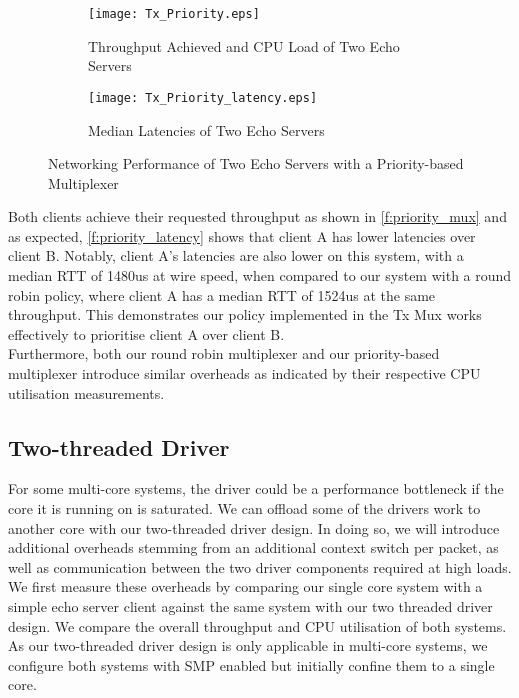 \noindent\begin{figure}[h]
    \centering
	\begin{multicols}{2}
		\begin{subfigure}[b]{0.45\textwidth}
        \centering
        \texttt{[image: Tx\_Priority.eps]}
        \caption{Throughput Achieved and CPU Load of Two Echo Servers}
        \label{f:priority_mux}
    \end{subfigure}\qquad
    \begin{subfigure}[b]{0.45\textwidth}
        \vspace{52pt}
        \centering
        \texttt{[image: Tx\_Priority\_latency.eps]}
        \vspace{0.5pt}
        \caption{Median Latencies of Two Echo Servers}
        \label{f:priority_latency}
    \end{subfigure}
\end{multicols}
\caption{Networking Performance of Two Echo Servers with a Priority-based Multiplexer}
\end{figure}

Both clients achieve their requested throughput as shown in \autoref{f:priority_mux} and as expected, \autoref{f:priority_latency} shows
that client A has lower latencies over client B. Notably, client A's latencies are also lower on this system, with a median RTT
of 1480us at wire speed, when compared to our system with a round robin policy, where client A has a median RTT of 1524us at the same
throughput. This demonstrates our policy implemented in the Tx Mux works effectively to prioritise
client A over client B.\\
Furthermore, both our round robin multiplexer and our priority-based multiplexer introduce similar overheads as indicated by their 
respective CPU utilisation measurements. \\

\newpage

\subsection{Two-threaded Driver}
For some multi-core systems, the driver could be a performance bottleneck if the core it is running on is saturated. We can offload
some of the drivers work to another core with our two-threaded driver design. In doing so, we will introduce additional overheads
stemming from an additional context switch per packet, as well as communication between the two driver components required at
high loads. We first measure these overheads by comparing our single core system with a simple echo server client against the 
same system with our two threaded driver design. We compare the overall throughput and CPU utilisation of both systems. As 
our two-threaded driver design is only applicable in multi-core systems, we configure both systems with SMP enabled but 
initially confine them to a single core.

